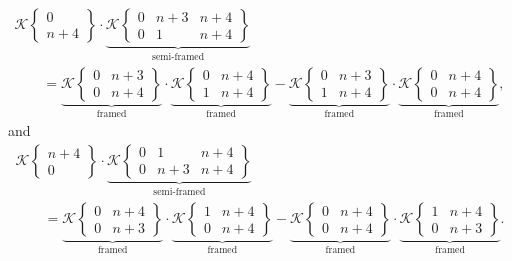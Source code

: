 \documentclass[pdftex]{sigma}
\numberwithin{equation}{section}
\begin{document}
\begin{gather}
\\
 \mathscr{K}\left\lbrace \begin{matrix} 0 \\ n+4 \end{matrix} \right\rbrace
			\cdot \underbrace{ \mathscr{K}\left\lbrace \begin{matrix} 0 & n+3 & n+4 \\ 0 & 1 & n+4 \end{matrix} \right\rbrace }_{\text{semi-framed}} \nonumber\\
\qquad= \underbrace{\mathscr{K}\left\lbrace \begin{matrix} 0 & n+3 \\ 0 & n+4 \end{matrix} \right\rbrace}_{\text{framed}} \cdot \underbrace{\mathscr{K}\left\lbrace \begin{matrix} 0 & n+4 \\ 1 & n+4 \end{matrix} \right\rbrace}_{\text{framed}} - \underbrace{\mathscr{K}\left\lbrace \begin{matrix} 0 & n+3 \\ 1 & n+4 \end{matrix} \right\rbrace}_{\text{framed}} \cdot \underbrace{\mathscr{K}\left\lbrace \begin{matrix} 0 & n+4 \\ 0 & n+4 \end{matrix} \right\rbrace}_{\text{framed}},\nonumber
		\end{gather}
		and
		\begin{gather}
\mathscr{K}\left\lbrace \begin{matrix} n+4 \\ 0 \end{matrix} \right\rbrace
			\cdot \underbrace{ \mathscr{K}\left\lbrace \begin{matrix} 0 & 1 & n+4 \\ 0 & n+3 & n+4 \end{matrix} \right\rbrace }_{\text{semi-framed}} \nonumber\\
\qquad= \underbrace{\mathscr{K}\left\lbrace \begin{matrix} 0 & n+4 \\ 0 & n+3 \end{matrix} \right\rbrace}_{\text{framed}} \cdot \underbrace{\mathscr{K}\left\lbrace \begin{matrix} 1 & n+4 \\ 0 & n+4 \end{matrix} \right\rbrace}_{\text{framed}} - \underbrace{\mathscr{K}\left\lbrace \begin{matrix} 0 & n+4 \\ 0 & n+4 \end{matrix} \right\rbrace}_{\text{framed}} \cdot \underbrace{\mathscr{K}\left\lbrace \begin{matrix} 1 & n+4 \\ 0 & n+3 \end{matrix} \right\rbrace}_{\text{framed}}.\label{DODGSON framed F}
		\end{gather}
\end{document}
